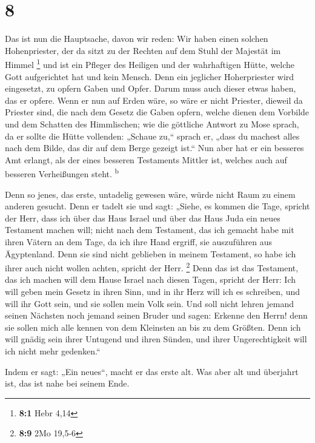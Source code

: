\hypertarget{section-7}{%
\section{8}\label{section-7}}

 Das ist nun die Hauptsache, davon wir reden: Wir haben
einen solchen Hohenpriester, der da sitzt zu der Rechten auf dem Stuhl
der Majestät im Himmel \footnote{\textbf{8:1} Hebr 4,14} 
und ist ein Pfleger des Heiligen und der wahrhaftigen Hütte, welche Gott
aufgerichtet hat und kein Mensch.  Denn ein jeglicher
Hoherpriester wird eingesetzt, zu opfern Gaben und Opfer. Darum muss
auch dieser etwas haben, das er opfere.  Wenn er nun auf
Erden wäre, so wäre er nicht Priester, dieweil da Priester sind, die
nach dem Gesetz die Gaben opfern,  welche dienen dem
Vorbilde und dem Schatten des Himmlischen; wie die göttliche Antwort zu
Mose sprach, da er sollte die Hütte vollenden: „Schaue zu,`` sprach er,
„dass du machest alles nach dem Bilde, das dir auf dem Berge gezeigt
ist.``  Nun aber hat er ein besseres Amt erlangt, als der
eines besseren Testaments Mittler ist, welches auch auf besseren
Verheißungen steht. \textsuperscript{b}

 Denn so jenes, das erste, untadelig gewesen wäre, würde
nicht Raum zu einem anderen gesucht.  Denn er tadelt sie
und sagt: „Siehe, es kommen die Tage, spricht der Herr, dass ich über
das Haus Israel und über das Haus Juda ein neues Testament machen will;
 nicht nach dem Testament, das ich gemacht habe mit ihren
Vätern an dem Tage, da ich ihre Hand ergriff, sie auszuführen aus
Ägyptenland. Denn sie sind nicht geblieben in meinem Testament, so habe
ich ihrer auch nicht wollen achten, spricht der Herr. \footnote{\textbf{8:9}
  2Mo 19,5-6}  Denn das ist das Testament, das ich machen
will dem Hause Israel nach diesen Tagen, spricht der Herr: Ich will
geben mein Gesetz in ihren Sinn, und in ihr Herz will ich es schreiben,
und will ihr Gott sein, und sie sollen mein Volk sein. 
Und soll nicht lehren jemand seinen Nächsten noch jemand seinen Bruder
und sagen: Erkenne den Herrn! denn sie sollen mich alle kennen von dem
Kleinsten an bis zu dem Größten.  Denn ich will gnädig
sein ihrer Untugend und ihren Sünden, und ihrer Ungerechtigkeit will ich
nicht mehr gedenken.``

 Indem er sagt: „Ein neues``, macht er das erste alt. Was
aber alt und überjahrt ist, das ist nahe bei seinem Ende.

